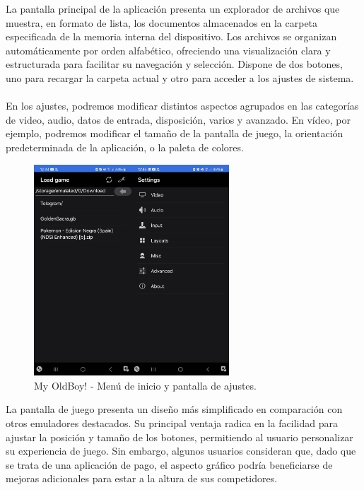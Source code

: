 \clearpage

La pantalla principal de la aplicación presenta un explorador de archivos que muestra, en formato de lista, los documentos almacenados en la carpeta especificada de la memoria interna del dispositivo. Los archivos se organizan automáticamente por orden alfabético, ofreciendo una visualización clara y estructurada para facilitar su navegación y selección. Dispone de dos botones, uno para recargar la carpeta actual y otro para acceder a los ajustes de sistema. 
\\\\
En los ajustes, podremos modificar distintos aspectos agrupados en las categorías de video, audio, datos de entrada, disposición, varios y avanzado. En vídeo, por ejemplo, podremos modificar el tamaño de la pantalla de juego, la orientación predeterminada de la aplicación, o la paleta de colores.

\begin{figure}[h]
    \centering
    \includegraphics[width=0.65\textwidth]{include/images/myoldboy2.jpg}
    \caption{My OldBoy! - Menú de inicio y pantalla de ajustes.}
    \label{figure:oldboy2}
\end{figure}

\clearpage

La pantalla de juego presenta un diseño más simplificado en comparación con otros emuladores destacados. Su principal ventaja radica en la facilidad para ajustar la posición y tamaño de los botones, permitiendo al usuario personalizar su experiencia de juego. Sin embargo, algunos usuarios consideran que, dado que se trata de una aplicación de pago, el aspecto gráfico podría beneficiarse de mejoras adicionales para estar a la altura de sus competidores.

